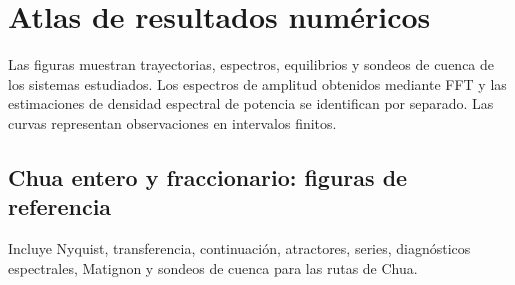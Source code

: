 \ifHAFOdigitalcontent
\section{Atlas de resultados numéricos}
\label{part:atlas}
Las figuras muestran trayectorias, espectros, equilibrios y sondeos de
cuenca de los sistemas estudiados. Los espectros de amplitud obtenidos mediante
FFT y las estimaciones de densidad espectral de potencia se identifican por
separado. Las curvas representan observaciones en intervalos finitos.

\clearpage
\subsection{Chua entero y fraccionario: figuras de referencia}
Incluye Nyquist, transferencia, continuación, atractores, series, diagnósticos espectrales, Matignon y sondeos de cuenca para las rutas de Chua.

